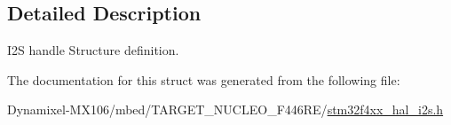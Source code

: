 \subsection{Detailed Description}
I2S handle Structure definition. 

The documentation for this struct was generated from the following file\+:\begin{DoxyCompactItemize}
\item 
Dynamixel-\/\+M\+X106/mbed/\+T\+A\+R\+G\+E\+T\+\_\+\+N\+U\+C\+L\+E\+O\+\_\+\+F446\+R\+E/\hyperlink{stm32f4xx__hal__i2s_8h}{stm32f4xx\+\_\+hal\+\_\+i2s.\+h}\end{DoxyCompactItemize}
